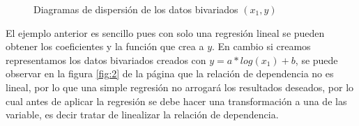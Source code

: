 \documentclass{article}
\begin{document}
\begin{figure}
\centering
{}
\label{fig:a}
\centering
{}
\label{fig:b}
\centering
\caption{Diagramas de dispersión de los datos bivariados $(x_1 , y)$ }
\label{fig:1} 
\end{figure}
El ejemplo anterior es sencillo pues con solo una regresión lineal se pueden obtener los coeficientes y la función que crea a $y$. En cambio si creamos representamos los datos bivariados creados con $y= a*log(x_1)+ b$, se puede observar en la figura \ref{fig:2} de la página \pageref{fig:2} que la relación de dependencia no es lineal, por lo que una simple regresión no arrogará los resultados deseados, por lo cual antes de aplicar la regresión se debe hacer una transformación a una de las variable, es decir tratar de linealizar la relación de dependencia.
\end{document}
